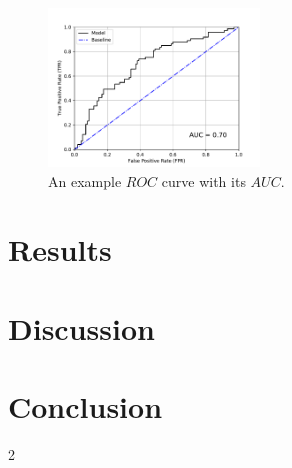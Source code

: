 \documentclass[a4paper,10pt,english]{article}
\begin{document}
\begin{multicols*}{2}
\begin{figure}[H]
	\centering
	\includegraphics[width = 0.5\textwidth, center]{roc_sample.pdf}
	\caption{An example $ROC$ curve with its $AUC$.\label{fig_roc_sample}}
\end{figure}

\section*{Results}

\section*{Discussion}

\section*{Conclusion}

{}

\end{multicols*}{2}
\end{document}
